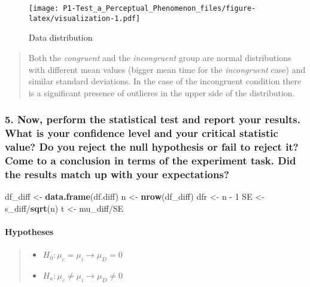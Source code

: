\documentclass[]{article}
\newenvironment{Shaded}{\begin{snugshade}}{\end{snugshade}}
\newcommand{\KeywordTok}[1]{\textcolor[rgb]{0.13,0.29,0.53}{\textbf{{#1}}}}
\newcommand{\DecValTok}[1]{\textcolor[rgb]{0.00,0.00,0.81}{{#1}}}
\newcommand{\StringTok}[1]{\textcolor[rgb]{0.31,0.60,0.02}{{#1}}}
\newcommand{\NormalTok}[1]{{#1}}
\providecommand{\tightlist}{%
  \setlength{\itemsep}{0pt}\setlength{\parskip}{0pt}}
\let\oldparagraph\paragraph
\renewcommand{\paragraph}[1]{\oldparagraph{#1}\mbox{}}
\begin{document}
\begin{figure}[htbp]
\centering
\texttt{[image: P1-Test\_a\_Perceptual\_Phenomenon\_files/figure-latex/visualization-1.pdf]}
\caption{Data distribution \label{fig1_normal}}
\end{figure}

\begin{quote}
Both the \emph{congruent} and the \emph{incongruent} group are normal
distributions with different mean values (bigger mean time for the
\emph{incongruent} case) and similar standard deviations. In the case of
the incongruent condition there is a significant presence of outlieres
in the upper side of the distribution.
\end{quote}

\subsubsection{5. Now, perform the statistical test and report your
results. What is your confidence level and your critical statistic
value? Do you reject the null hypothesis or fail to reject it? Come to a
conclusion in terms of the experiment task. Did the results match up
with your
expectations?}\label{now-perform-the-statistical-test-and-report-your-results.-what-is-your-confidence-level-and-your-critical-statistic-value-do-you-reject-the-null-hypothesis-or-fail-to-reject-it-come-to-a-conclusion-in-terms-of-the-experiment-task.-did-the-results-match-up-with-your-expectations}

\begin{Shaded}
\begin{Highlighting}[]
\NormalTok{df_diff <-}\StringTok{ }\KeywordTok{data.frame}\NormalTok{(df.diff)}
\NormalTok{n <-}\StringTok{ }\KeywordTok{nrow}\NormalTok{(df_diff)}
\NormalTok{dfr <-}\StringTok{ }\NormalTok{n -}\StringTok{ }\DecValTok{1}
\NormalTok{SE <-}\StringTok{ }\NormalTok{s_diff/}\KeywordTok{sqrt}\NormalTok{(n)}
\NormalTok{t <-}\StringTok{ }\NormalTok{mu_diff/SE}
\end{Highlighting}
\end{Shaded}

\paragraph{\texorpdfstring{\textbf{Hypotheses}}{Hypotheses}}\label{hypotheses}

\begin{quote}
\begin{itemize}
\tightlist
\item
  \(H_0 : \mu_{c} = \mu_{i} \rightarrow \mu_D =0\)
\item
  \(H_a : \mu_{c} \neq \mu_{i} \rightarrow \mu_D \neq 0\)
\end{itemize}
\end{quote}
\end{document}
